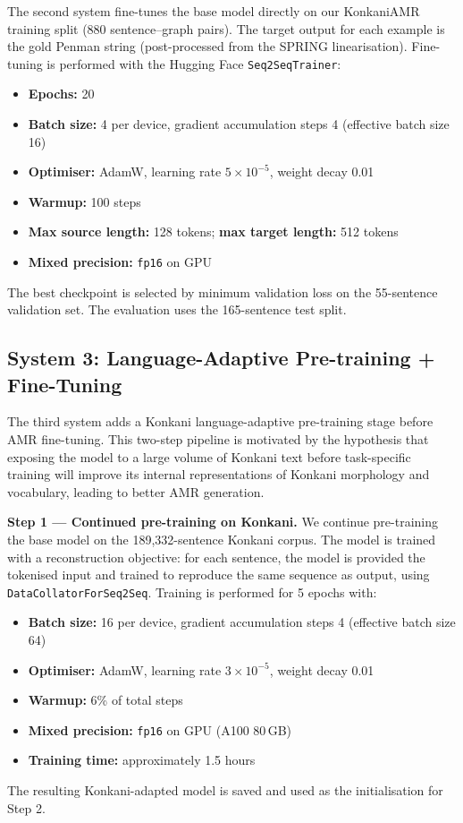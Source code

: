 The second system fine-tunes the base model directly on our KonkaniAMR training split (880 sentence–graph pairs). The target output for each example is the gold Penman string (post-processed from the SPRING linearisation). Fine-tuning is performed with the Hugging Face \texttt{Seq2SeqTrainer}:

\begin{itemize}
    \item \textbf{Epochs:} 20
    \item \textbf{Batch size:} 4 per device, gradient accumulation steps 4 (effective batch size 16)
    \item \textbf{Optimiser:} AdamW, learning rate $5 \times 10^{-5}$, weight decay 0.01
    \item \textbf{Warmup:} 100 steps
    \item \textbf{Max source length:} 128 tokens; \textbf{max target length:} 512 tokens
    \item \textbf{Mixed precision:} \texttt{fp16} on GPU
\end{itemize}

The best checkpoint is selected by minimum validation loss on the 55-sentence validation set. The evaluation uses the 165-sentence test split.

\subsection{System 3: Language-Adaptive Pre-training + Fine-Tuning}

The third system adds a Konkani language-adaptive pre-training stage before AMR fine-tuning. This two-step pipeline is motivated by the hypothesis that exposing the model to a large volume of Konkani text before task-specific training will improve its internal representations of Konkani morphology and vocabulary, leading to better AMR generation.

\textbf{Step 1 — Continued pre-training on Konkani.} We continue pre-training the base model on the 189,332-sentence Konkani corpus. The model is trained with a reconstruction objective: for each sentence, the model is provided the tokenised input and trained to reproduce the same sequence as output, using \texttt{DataCollatorForSeq2Seq}. Training is performed for 5 epochs with:
\begin{itemize}
    \item \textbf{Batch size:} 16 per device, gradient accumulation steps 4 (effective batch size 64)
    \item \textbf{Optimiser:} AdamW, learning rate $3 \times 10^{-5}$, weight decay 0.01
    \item \textbf{Warmup:} 6\% of total steps
    \item \textbf{Mixed precision:} \texttt{fp16} on GPU (A100 80\,GB)
    \item \textbf{Training time:} approximately 1.5 hours
\end{itemize}
The resulting Konkani-adapted model is saved and used as the initialisation for Step 2.

